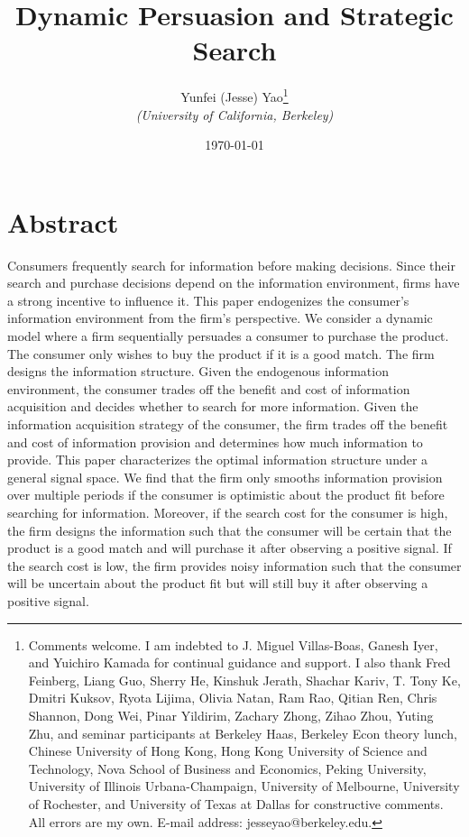 \documentclass[11pt]{extarticle}
\author{\Large Yunfei (Jesse) Yao\footnote{\hspace{0.1in}Comments welcome. I am indebted to J. Miguel Villas-Boas, Ganesh Iyer, and Yuichiro Kamada for continual guidance and support. I also thank Fred Feinberg, Liang Guo, Sherry He, Kinshuk Jerath, Shachar Kariv, T. Tony Ke, Dmitri Kuksov, Ryota Lijima, Olivia Natan, Ram Rao, Qitian Ren, Chris Shannon, Dong Wei, Pinar Yildirim, Zachary Zhong, Zihao Zhou, Yuting Zhu, and seminar participants at Berkeley Haas, Berkeley Econ theory lunch, Chinese University of Hong Kong, Hong Kong University of Science and Technology, Nova School of Business and Economics, Peking University, University of Illinois Urbana-Champaign, University of Melbourne, University of Rochester, and University of Texas at Dallas for constructive comments. All errors are my own. E-mail address: jesseyao@berkeley.edu.} \\ \textit{(University of California, Berkeley)} \\[50pt]}
\date{\Large \today} %
\title{\Huge Dynamic Persuasion and Strategic Search \\[10pt]}
\begin{document}
	\maketitle
\thispagestyle{empty}

\newpage
\section*{Abstract}	
Consumers frequently search for information before making decisions. Since their search and purchase decisions depend on the information environment, firms have a strong incentive to influence it. This paper endogenizes the consumer’s information environment from the firm’s perspective. We consider a dynamic model where a firm sequentially persuades a consumer to purchase the product. The consumer only wishes to buy the product if it is a good match. The firm designs the information structure. Given the endogenous information environment, the consumer trades off the benefit and cost of information acquisition and decides whether to search for more information. Given the information acquisition strategy of the consumer, the firm trades off the benefit and cost of information provision and determines how much information to provide. This paper characterizes the optimal information structure under a general signal space. We find that the firm only smooths information provision over multiple periods if the consumer is optimistic about the product fit before searching for information. Moreover, if the search cost for the consumer is high, the firm designs the information such that the consumer will be certain that the product is a good match and will purchase it after observing a positive signal. If the search cost is low, the firm provides noisy information such that the consumer will be uncertain about the product fit but will still buy it after observing a positive signal. 


\thispagestyle{empty}

\newpage	
\setcounter{page}{1}
\end{document}
